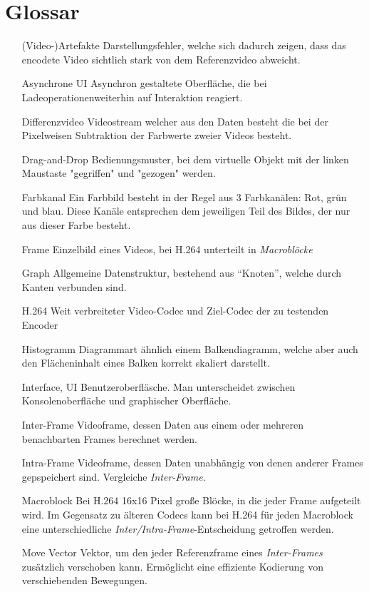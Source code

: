 \section{Glossar}

\begin{itemize}
    \item[(Video-)Artefakte] Darstellungsfehler, welche sich dadurch zeigen, dass das encodete Video sichtlich stark von dem Referenzvideo abweicht.
    \item[Asynchrone UI] Asynchron gestaltete Oberfläche, die bei Ladeoperationenweiterhin auf Interaktion reagiert.
    \item[Differenzvideo] Videostream welcher aus den Daten besteht die bei der Pixelweisen Subtraktion der Farbwerte zweier Videos besteht.
    \item[Drag-and-Drop] Bedienungsmuster, bei dem virtuelle Objekt mit der linken Maustaste "gegriffen" und "gezogen" werden.
    \item[Farbkanal] Ein Farbbild besteht in der Regel aus 3 Farbkanälen: Rot, grün und blau. Diese Kanäle entsprechen dem jeweiligen Teil des Bildes, der nur aus dieser Farbe besteht.
    \item[Frame] Einzelbild eines Videos, bei H.264 unterteilt in \emph{Macroblöcke}
    \item[Graph] Allgemeine Datenstruktur, bestehend aus ``Knoten'', welche durch Kanten verbunden sind.
    \item[H.264] Weit verbreiteter Video-Codec und Ziel-Codec der zu testenden Encoder
    \item[Histogramm] Diagrammart ähnlich einem Balkendiagramm, welche aber auch den Flächeninhalt eines Balken korrekt skaliert darstellt.
    \item[Interface, UI] Benutzeroberfläsche. Man unterscheidet zwischen Konsolenoberfläche und graphischer Oberfläche.
    \item[Inter-Frame] Videoframe, dessen Daten aus einem oder mehreren benachbarten Frames berechnet werden.
    \item[Intra-Frame] Videoframe, dessen Daten unabhängig von denen anderer Frames gepspeichert sind. Vergleiche \emph{Inter-Frame}.
    \item[Macroblock] Bei H.264 16x16 Pixel große Blöcke, in die jeder Frame aufgeteilt wird. Im Gegensatz zu älteren Codecs kann bei H.264 für jeden Macroblock eine unterschiedliche \emph{Inter/Intra-Frame}-Entscheidung getroffen werden. 
    \item[Move Vector] Vektor, um den jeder Referenzframe eines \emph{Inter-Frames} zusätzlich verschoben kann. Ermöglicht eine effiziente Kodierung von verschiebenden Bewegungen.

\end{itemize}

